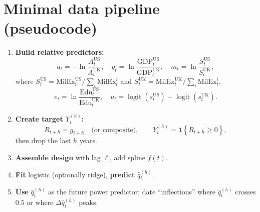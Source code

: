 \documentclass[11pt]{article}
\newcommand{\US}{\mathrm{US}}
\newcommand{\UK}{\mathrm{UK}}
\newcommand{\logit}{\operatorname{logit}}
\newcommand{\ind}[1]{\mathbf{1}\!\left\{#1\right\}}
\begin{document}
\section{Minimal data pipeline (pseudocode)}

\begin{enumerate}[leftmargin=1.5em]
\item \textbf{Build relative predictors:}
\[
\tilde a_t = -\ln\!\frac{A^{\US}_t}{A^{\UK}_t},\quad
g_t = \ln\!\frac{\mathrm{GDP}^{\US}_t}{\mathrm{GDP}^{\UK}_t},\quad
m_t = \ln\!\frac{S^{\US}_t}{S^{\UK}_t},
\]
where $S^{\US}_t = \mathrm{MilEx}^{\US}_t/\sum_i \mathrm{MilEx}^i_t$ and $S^{\UK}_t = \mathrm{MilEx}^{\UK}_t/\sum_i \mathrm{MilEx}^i_t$,
\[
e_t = \ln\!\frac{\mathrm{Edu}^{\US}_t}{\mathrm{Edu}^{\UK}_t},\quad
u_t = \logit(s^{\US}_t) - \logit(s^{\UK}_t).
\]

\item \textbf{Create target $Y^{(h)}_t$:}
\[
R_{t+h} = g_{t+h}\quad\text{(or composite)},\qquad
Y^{(h)}_t = \ind{R_{t+h}\ge 0},
\]
then drop the last $h$ years.

\item \textbf{Assemble design} with lag $\ell$, add spline $f(t)$.

\item \textbf{Fit} logistic (optionally ridge), \textbf{predict} $\hat q^{(h)}_t$.

\item \textbf{Use} $\hat q^{(h)}_t$ as the future power predictor; date ``inflections'' where $\hat q^{(h)}_t$ crosses $0.5$ or where $\Delta \hat q^{(h)}_t$ peaks.
\end{enumerate}
\end{document}
